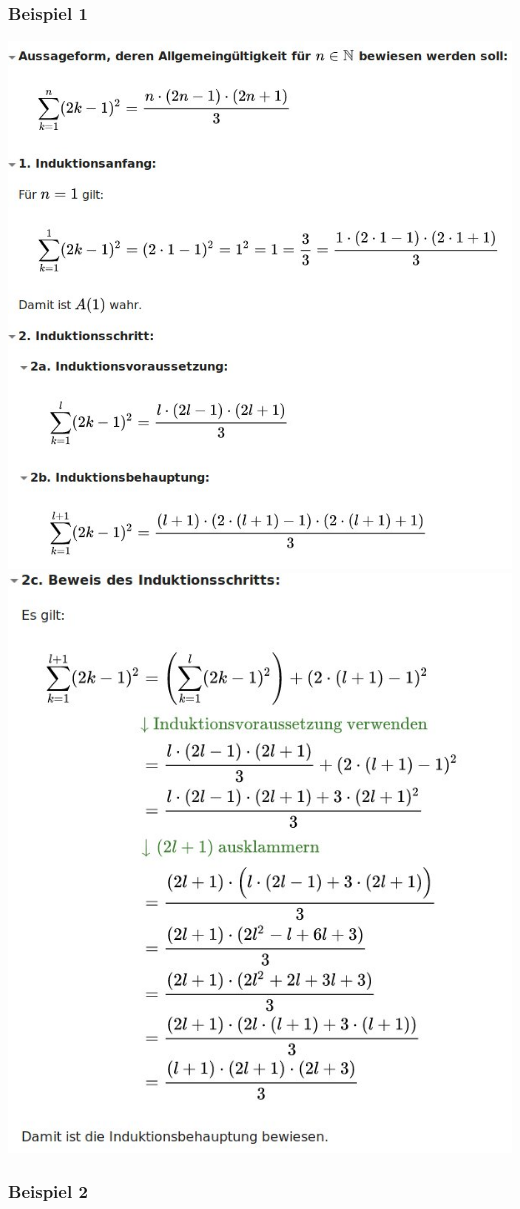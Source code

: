\documentclass[14pt,a4paper]{article}
\begin{document}
\subsubsection{Beispiel 1}
\includegraphics[scale=0.6]{vorlagen/induktion3.jpg} \newpage
\includegraphics[scale=0.6]{vorlagen/induktion4.jpg} 
\subsubsection{Beispiel 2}
\end{document}
